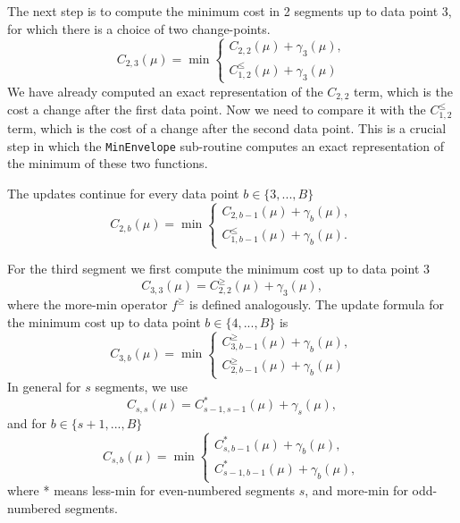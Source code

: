 \documentclass{article}
\begin{document}
The next step is to compute the minimum cost in 2 segments up to data
point 3, for which there is a choice of two change-points.
\begin{equation*}
  C_{2,3}(\mu) = \min
  \begin{cases}
    C_{2,2}(\mu)+\gamma_3(\mu), \\
    C_{1,2}^{\leq}(\mu)+\gamma_3(\mu)
  \end{cases}
\end{equation*}
We have already computed an exact representation of the $C_{2,2}$
term, which is the cost a change after the first data point. Now we
need to compare it with the $C_{1,2}^{\leq}$ term, which is the cost
of a change after the second data point. This is a crucial step in
which the \texttt{MinEnvelope} sub-routine computes an exact
representation of the minimum of these two functions.

The updates continue for every data point $b\in\{3, ..., B\}$
\begin{equation*}
  C_{2,b}(\mu) = \min
  \begin{cases}
    C_{2,b-1}(\mu) + \gamma_b(\mu),\\
    C_{1,b-1}^{\leq}(\mu) + \gamma_b(\mu).
  \end{cases}
\end{equation*}

For the third segment we first compute the minimum cost up to data point 3
\begin{equation*}
  C_{3,3}(\mu) = C_{2,2}^{\geq}(\mu) + \gamma_3(\mu),
\end{equation*}
where the more-min operator $f^\geq$ is defined analogously. The
update formula for the minimum cost up to data point
$b\in\{4, ..., B\}$ is
\begin{equation*}
  C_{3,b}(\mu) = \min
  \begin{cases}
    C_{3,b-1}^{\geq}(\mu)+\gamma_b(\mu),\\
    C_{2,b-1}^{\geq}(\mu)+\gamma_b(\mu)
  \end{cases}
\end{equation*}
In general for $s$ segments, we use
\begin{equation}
  C_{s,s}(\mu) = C_{s-1,s-1}^{*}(\mu) + \gamma_s(\mu),
\end{equation}
and for $b\in\{s+1, ..., B\}$
\begin{equation}
  C_{s,b}(\mu) = \min
  \begin{cases}
    C_{s,b-1}^{*}(\mu)+\gamma_b(\mu),\\
    C_{s-1,b-1}^{*}(\mu)+\gamma_b(\mu),
  \end{cases}
\end{equation}
where * means less-min for even-numbered segments $s$, and more-min
for odd-numbered segments.
\end{document}
